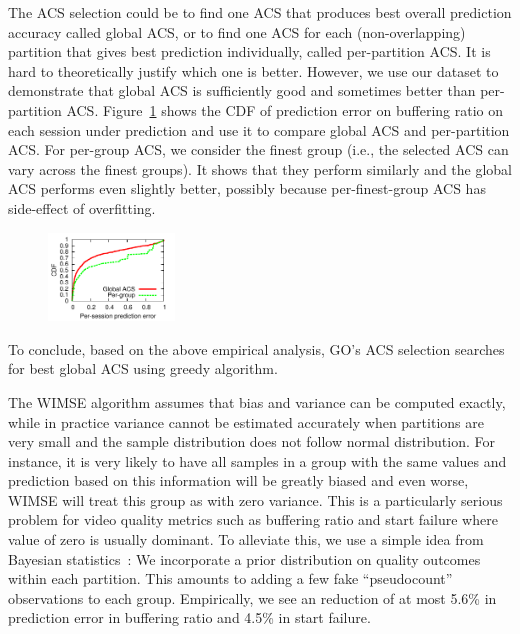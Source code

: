  The ACS selection could be to find one ACS that produces best overall prediction accuracy called global ACS, or to find one ACS for each (non-overlapping) partition that gives best prediction individually, called per-partition ACS. 
It is hard to theoretically justify which one is better. However, we use our dataset to demonstrate that global ACS is sufficiently good and sometimes better than per-partition ACS.
Figure~\ref{fig:global-acs} shows the CDF of prediction error on buffering ratio on each session under prediction and use it to compare global ACS and per-partition ACS. For per-group ACS, we consider the finest group (i.e., the selected ACS can vary across the finest groups). It shows that they perform similarly and the global ACS performs even slightly better, possibly because per-finest-group ACS has side-effect of overfitting.

\begin{figure}[h!]
\centering
 \includegraphics[width=0.3\textwidth] {figures/newfig/example-granular-metric0-new.pdf}
\label{fig:global-acs}
\end{figure}

To conclude, based on the above empirical analysis, GO's ACS selection searches for best global ACS using greedy algorithm. 

\label{subsec:sudo}
The WIMSE algorithm assumes that bias and variance can be computed exactly, while in practice variance cannot be estimated accurately when partitions are very small and the sample distribution does not follow normal distribution. For instance, it is very likely to have all samples in a group with the same values and prediction based on this information will be greatly biased and even worse, WIMSE will treat this group as with zero variance. This is a particularly serious problem for video quality metrics such as buffering ratio and start failure where value of zero is usually dominant.
To alleviate this, we use a simple idea from Bayesian statistics~\cite{flach2012machine}: We incorporate a prior distribution on quality outcomes within each partition.  This amounts to adding a few fake ``pseudocount'' observations to each group.  Empirically, we see an reduction of at most 5.6\% in prediction error in buffering ratio and 4.5\% in start failure.


